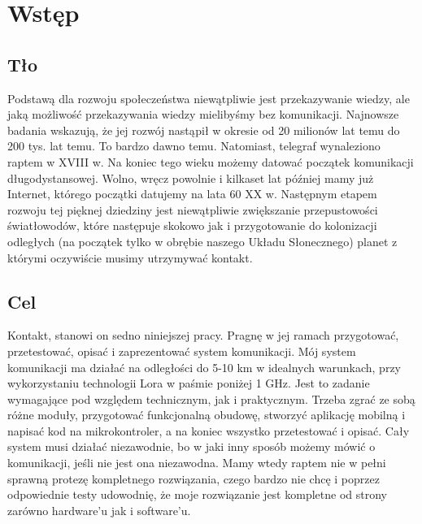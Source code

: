 \chapter{Wstęp}
\section{Tło}
Podstawą dla rozwoju społeczeństwa niewątpliwie jest przekazywanie wiedzy, ale jaką możliwość przekazywania wiedzy mielibyśmy bez komunikacji.
Najnowsze badania\cite{doi:10.1126/sciadv.aaw3916} wskazują, że jej rozwój nastąpił w okresie od 20 milionów lat temu do 200 tys. lat temu. To bardzo dawno temu. Natomiast, telegraf\cite{wiki:telegraf} wynaleziono raptem w XVIII w. Na koniec tego wieku możemy datować początek komunikacji długodystansowej. Wolno, wręcz powolnie i kilkaset lat później mamy już Internet\cite{wiki:internet}, którego początki datujemy na lata 60 XX w. Następnym etapem rozwoju tej pięknej dziedziny jest niewątpliwie zwiększanie przepustowości światłowodów, które następuje skokowo jak i przygotowanie do kolonizacji odległych (na początek tylko w obrębie naszego Układu Słonecznego) planet z którymi oczywiście musimy utrzymywać kontakt.
\section{Cel}
Kontakt, stanowi on sedno niniejszej pracy. Pragnę w jej ramach przygotować, przetestować, opisać i zaprezentować system komunikacji.
Mój system komunikacji ma działać na odległości do 5-10 km w idealnych warunkach, przy wykorzystaniu technologii Lora\cite{enwiki:lora} w paśmie poniżej 1 GHz.
Jest to zadanie wymagające pod względem technicznym, jak i praktycznym. Trzeba zgrać ze sobą różne moduły, przygotować funkcjonalną obudowę, stworzyć aplikację mobilną i napisać kod na mikrokontroler, a na koniec wszystko przetestować i opisać. Cały system musi działać niezawodnie, bo w jaki inny sposób możemy mówić o komunikacji, jeśli nie jest ona niezawodna. Mamy wtedy raptem nie w pełni sprawną protezę kompletnego rozwiązania, czego bardzo nie chcę i poprzez odpowiednie testy udowodnię, że moje rozwiązanie jest kompletne od strony zarówno hardware'u jak i software'u.
